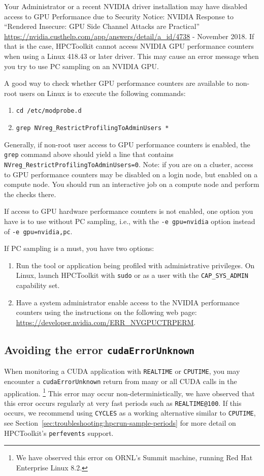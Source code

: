 \documentclass[11pt,twoside,letterpaper]{report}
\begin{document}
Your Administrator or a recent NVIDIA driver installation may have disabled access to GPU Performance due to Security Notice: NVIDIA Response to ``Rendered Insecure: GPU Side Channel Attacks are Practical'' \url{https://nvidia.custhelp.com/app/answers/detail/a_id/4738} - November 2018.
If that is the case, HPCToolkit cannot access NVIDIA GPU performance counters when using a Linux 418.43 or later driver. This may cause an error message when you try to use PC sampling on an NVIDIA GPU.

A good way to check whether GPU performance counters are available to non-root users on Linux is to execute the following commands:
\begin{enumerate}
\item {\tt cd /etc/modprobe.d}
\item \verb|grep NVreg_RestrictProfilingToAdminUsers *|
\end{enumerate}
\noindent Generally, if non-root user access to GPU performance counters is enabled, the {\tt grep} command above should yield a line that contains {\tt NVreg\_RestrictProfilingToAdminUsers=0}.
Note: if you are on a cluster, access to GPU performance counters may be disabled on a login node, but enabled on a compute node. You should run an interactive job on a compute node and perform the checks there.

If access to GPU hardware performance counters is not enabled, one option you have is to use \hpcrun{} without PC sampling, i.e., with the {\tt -e gpu=nvidia} option instead of {\tt -e gpu=nvidia,pc}.

If PC sampling is a must, you have two  options:
\begin{enumerate}
\item Run the tool or application being profiled with administrative privileges.
On Linux, launch HPCToolkit with {\tt sudo} or as a user with the {\tt CAP\_SYS\_ADMIN} capability set.
\item Have a system administrator enable access to the NVIDIA performance counters using the instructions on the following web page: \url{https://developer.nvidia.com/ERR_NVGPUCTRPERM}.
\end{enumerate}


\subsection{Avoiding the error \texttt{cudaErrorUnknown}}
When monitoring a CUDA application with \texttt{REALTIME} or \texttt{CPUTIME}, you may encounter a
\texttt{cudaErrorUnknown} return from many or all CUDA calls in the application.
\footnote{We have observed this error on ORNL's Summit machine, running Red Hat Enterprise Linux 8.2.}
This error may occur non-deterministically, we have observed that this error occurs regularly
at very fast periods such as \texttt{REALTIME@100}. If this occurs, we recommend using \texttt{CYCLES}
as a working alternative similar to \texttt{CPUTIME}, see Section~\ref{sec:troubleshooting:hpcrun-sample-periods}
for more detail on HPCToolkit's \texttt{perfevents} support.
\end{document}
